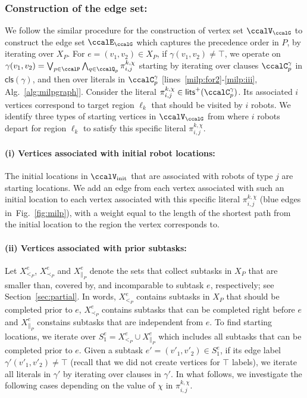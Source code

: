 \documentclass[Afour,sageh,times]{sagej}
\newcommand{\clause}[1]{\mathsf{cls}(#1)}
\renewcommand{\ap}[3]{\mathcal{\pi}_{{#1},{#2}}^{#3}}
\begin{document}
\subsubsection{Construction of  the edge set:}\label{sec:edge_set} We follow the similar procedure for the construction of vertex set $\ccalV_\ccalG$ to construct the edge set $\ccalE_\ccalG$ which captures the precedence order in ${P}$, by iterating over $X_P$. For $e = (v_1, v_2) \in X_{P}$, if $\gamma(v_1, v_2) \not=\top$, we operate on $\gamma(v_1, v_2) =  \bigvee_{p\in \ccalP} \bigwedge_{q \in \ccalQ_{p}} \ap{i}{j}{k,\chi}$ starting by iterating over clauses $\ccalC_p^{\gamma}$ in $\clause{\gamma}$, and then over literals in $\ccalC_p^\gamma$ [lines~\ref{milp:for2}-\ref{milp:iii}, Alg.~\ref{alg:milpgraph}]. Consider the literal $\ap{i}{j}{k,\chi} \in \mathsf{lits}^+(\ccalC_p^{\gamma})$. Its associated $i$ vertices correspond to target region $\ell_k$ that should be visited by $i$ robots. We identify three types of starting vertices in $\ccalV_\ccalG$ from where $i$ robots depart for region $\ell_k$ to satisfy this specific literal $\ap{i}{j}{k,\chi}$.
\paragraph{(i) Vertices associated with initial robot locations:}\label{sec:a} The initial locations in $\ccalV_{\text{init}}$ that are associated with  robots of type $j$ are starting locations. We add an edge from each vertex associated with such an initial location to each vertex associated with this specific literal $\ap{i}{j}{k,\chi}$ (blue edges in~Fig.~\ref{fig:milp}), with a weight equal to the length of the shortest path from the initial location to the region the vertex corresponds to.
\paragraph{(ii) Vertices associated with prior subtasks:}\label{sec:b} Let $X^e_{<_{P}}$, $X^e_{\prec_{P}}$ and $X^e_{\|_{P}}$ denote the sets that collect subtasks in $X_{P}$ that are  smaller than, covered by, and incomparable to subtask $e$, respectively; see Section~\ref{sec:partial}. In words, $X^e_{<_{P}}$ contains subtasks in $X_P$ that should be completed prior to $e$, $X^e_{\prec_{P}}$ contains subtasks that can be completed right before $e$ and $X^e_{\|_{P}}$ constains subtasks that are independent from $e$. To find starting locations, we iterate over $S_1^e = X^e_{<_{P}} \cup X^e_{\|_{P}}$ which includes all subtasks that can be completed prior to $e$.
Given a subtask $e' = (v'_1, v'_2) \in S_1^e$, if its edge label $\gamma'(v'_1, v'_2) \not=\top$ (recall that we did not create vertices for $\top$ labels), we iterate all literals in $\gamma'$ by iterating over clauses in $\gamma'$. In what follows, we investigate the following cases depending on the value of $\chi$ in $\ap{i}{j}{k,\chi}$.
\end{document}
